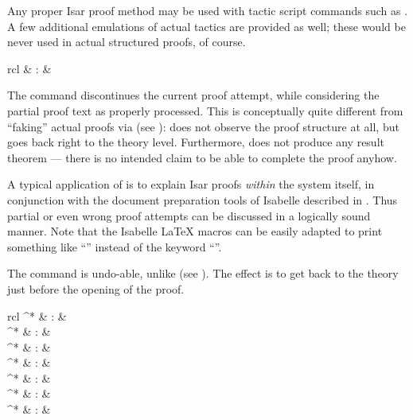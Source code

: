 \begin{isabellebody}
\begin{isamarkuptext}
\begin{descr}
  \end{descr}

  Any proper Isar proof method may be used with tactic script commands
  such as .  A few additional emulations of actual
  tactics are provided as well; these would be never used in actual
  structured proofs, of course.%
\end{isamarkuptext}%
\isamarkuptrue%
%
\isamarkuptrue%
%
\begin{isamarkuptext}%
\begin{matharray}{rcl}
     & : &  \\
  \end{matharray}

  The  command discontinues the current proof
  attempt, while considering the partial proof text as properly
  processed.  This is conceptually quite different from ``faking''
  actual proofs via  (see
  ):  does not observe the
  proof structure at all, but goes back right to the theory level.
  Furthermore,  does not produce any result theorem
  --- there is no intended claim to be able to complete the proof
  anyhow.

  A typical application of  is to explain Isar proofs
  \emph{within} the system itself, in conjunction with the document
  preparation tools of Isabelle described in \cite{isabelle-sys}.
  Thus partial or even wrong proof attempts can be discussed in a
  logically sound manner.  Note that the Isabelle {\LaTeX} macros can
  be easily adapted to print something like ``\isa{{\isasymdots}}'' instead of
  the keyword ``''.

  \medskip The  command is undo-able, unlike
   (see ).  The effect is to
  get back to the theory just before the opening of the proof.%
\end{isamarkuptext}%
\isamarkuptrue%
%
\isamarkuptrue%
%
\isamarkuptrue%
%
\begin{isamarkuptext}%
\begin{matharray}{rcl}
    ^* & : & \isarkeep{\cdot} \\
    ^* & : &  \\
    ^* & : &  \\
    ^* & : &  \\
    ^* & : &  \\
    ^* & : &  \\
    ^* & : &  \\
  \end{matharray}


\end{isamarkuptext}
\end{isabellebody}
